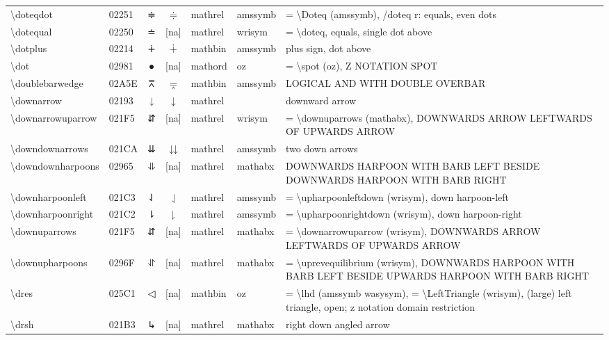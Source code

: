 \documentclass[a4paper,landscape]{article}
\begin{document}
\begin{longtable}{llcclll}
\textbackslash{}doteqdot & 02251 & ≑ & $\doteqdot$ & mathrel & amssymb & = \textbackslash{}Doteq (amssymb),  /doteq r: equals,  even dots \\
\textbackslash{}dotequal & 02250 & ≐ & [na] & mathrel & wrisym & = \textbackslash{}doteq,  equals,  single dot above \\
\textbackslash{}dotplus & 02214 & ∔ & $\dotplus$ & mathbin & amssymb & plus sign, dot above \\
\textbackslash{}dot & 02981 & ⦁ & [na] & mathord & oz & = \textbackslash{}spot (oz),  Z NOTATION SPOT \\
\textbackslash{}doublebarwedge & 02A5E & ⩞ & $\doublebarwedge$ & mathbin & amssymb & LOGICAL AND WITH DOUBLE OVERBAR \\
\textbackslash{}downarrow & 02193 & ↓ & $\downarrow$ & mathrel &  & downward arrow \\
\textbackslash{}downarrowuparrow & 021F5 & ⇵ & [na] & mathrel & wrisym & = \textbackslash{}downuparrows (mathabx),  DOWNWARDS ARROW LEFTWARDS OF UPWARDS ARROW \\
\textbackslash{}downdownarrows & 021CA & ⇊ & $\downdownarrows$ & mathrel & amssymb & two down arrows \\
\textbackslash{}downdownharpoons & 02965 & ⥥ & [na] & mathrel & mathabx & DOWNWARDS HARPOON WITH BARB LEFT BESIDE DOWNWARDS HARPOON WITH BARB RIGHT \\
\textbackslash{}downharpoonleft & 021C3 & ⇃ & $\downharpoonleft$ & mathrel & amssymb & = \textbackslash{}upharpoonleftdown (wrisym), down harpoon-left \\
\textbackslash{}downharpoonright & 021C2 & ⇂ & $\downharpoonright$ & mathrel & amssymb & = \textbackslash{}upharpoonrightdown (wrisym), down harpoon-right \\
\textbackslash{}downuparrows & 021F5 & ⇵ & [na] & mathrel & mathabx & = \textbackslash{}downarrowuparrow (wrisym), DOWNWARDS ARROW LEFTWARDS OF UPWARDS ARROW \\
\textbackslash{}downupharpoons & 0296F & ⥯ & [na] & mathrel & mathabx & = \textbackslash{}uprevequilibrium (wrisym), DOWNWARDS HARPOON WITH BARB LEFT BESIDE UPWARDS HARPOON WITH BARB RIGHT \\
\textbackslash{}dres & 025C1 & ◁ & [na] & mathbin & oz & = \textbackslash{}lhd (amssymb wasysym),  = \textbackslash{}LeftTriangle (wrisym),  (large) left triangle,  open; z notation domain restriction \\
\textbackslash{}drsh & 021B3 & ↳ & [na] & mathrel & mathabx & right down angled arrow \\

\end{longtable}
\end{document}
